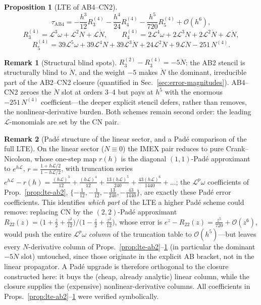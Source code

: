 \documentclass[11pt]{article}
\theoremstyle{plain}
\newtheorem{proposition}{Proposition}
\theoremstyle{definition}
\newtheorem{remark}{Remark}
\newcommand{\Lop}{\mathcal{L}}
\newcommand{\Ndot}{\dot{N}}
\newcommand{\Nddot}{\ddot{N}}
\newcommand{\Ndddot}{\dddot{N}}
\newcommand{\bO}{\mathcal{O}}
\begin{document}
\begin{proposition}[LTE of AB4--CN2]
\label{prop:lte-ab4}
\begin{equation}
\tau_{\mathrm{AB4}}
=-\frac{h^3}{12}R_3^{(4)}-\frac{h^4}{24}R_4^{(4)}
 -\frac{h^5}{720}R_5^{(4)}+\bO(h^6),
\end{equation}
\begin{equation}
R_3^{(4)}=\Lop^3\omega+\Lop^2N+\Lop\Ndot,\qquad
R_4^{(4)}=2\Lop^4\omega+2\Lop^3N+2\Lop^2\Ndot+\Lop\Nddot,
\end{equation}
\begin{equation}
R_5^{(4)}=39\Lop^5\omega+39\Lop^4N+39\Lop^3\Ndot+24\Lop^2\Nddot
+9\Lop\Ndddot-251\,N^{(4)}.
\end{equation}
\end{proposition}

\begin{remark}[Structural blind spots]
\label{rem:blindspot}
$R_3^{(2)}-R_3^{(4)}=-5\Nddot$: the AB2 stencil is structurally blind to
$\Nddot$, and the weight $-5$ makes $\Nddot$ the dominant, irreducible part of
the AB2--CN2 closure (quantified in Sec.~\ref{sec:error-magnitudes}). AB4--CN2
zeroes the $\Nddot$ slot at orders 3--4 but pays at $h^5$ with the enormous
$-251\,N^{(4)}$ coefficient---the deeper explicit stencil defers, rather than
removes, the nonlinear-derivative burden. Both schemes remain second order:
the leading $\Lop$-monomials are set by the CN pair.
\end{remark}

\begin{remark}[Pad\'e structure of the linear sector, and a Pad\'e
comparison of the full LTE]
\label{rem:pade}
On the linear sector ($N\equiv0$) the IMEX pair reduces to pure
Crank--Nicolson, whose one-step map $r(h)$ is the diagonal
$(1,1)$-Pad\'e approximant to $e^{h\Lop}$,
$r=\frac{1+h\Lop/2}{1-h\Lop/2}$, with truncation series
$e^{h\Lop}-r(h)=\tfrac{(h\Lop)^3}{12}+\tfrac{(h\Lop)^4}{12}
+\tfrac{13(h\Lop)^5}{240}+\tfrac{43(h\Lop)^6}{1440}+\dots$; the
$\Lop^p\omega$ coefficients of Prop.~\ref{prop:lte-ab2},
$\{-\tfrac1{12},-\tfrac1{12},-\tfrac{13}{240},-\tfrac{43}{1440}\}$, are
exactly these Pad\'e error coefficients. This identifies \emph{which part}
of the LTE a higher Pad\'e scheme could remove: replacing CN by the
$(2,2)$-Pad\'e approximant
$R_{22}(z)=\big(1+\tfrac z2+\tfrac{z^2}{12}\big)/
\big(1-\tfrac z2+\tfrac{z^2}{12}\big)$, whose error is
$e^{z}-R_{22}(z)=\tfrac{z^5}{720}+\bO(z^6)$, would push the entire
$\Lop^p\omega$ \emph{column} of the truncation table to $\bO(h^5)$---but
leaves every $N$-derivative column of
Props.~\ref{prop:lte-ab2}--\ref{prop:lte-ab4} (in particular the dominant
$-5\Nddot$ slot) untouched, since those originate in the explicit AB
bracket, not in the linear propagator. A Pad\'e upgrade is therefore
orthogonal to the closure constructed here: it buys the (cheap, already
analytic) linear column, while the closure supplies the (expensive)
nonlinear-derivative columns. All coefficients in
Props.~\ref{prop:lte-ab2}--\ref{prop:lte-ab4} were verified symbolically.
\end{remark}
\end{document}

